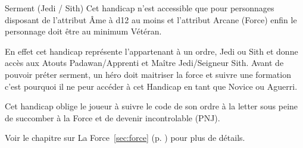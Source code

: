 \begin{paperbox}{Serment (Jedi / Sith)}
    Cet handicap n'est accessible que pour personnages disposant de l'attribut \^Ame à d12 au moins et l'attribut Arcane (Force) enfin le personnage doit être au minimum Vétéran. 

    En effet cet handicap représente l'appartenant à un ordre, Jedi ou Sith et donne accès aux Atouts Padawan/Apprenti et Maître Jedi/Seigneur Sith. Avant de pouvoir préter serment, un héro doit maitriser la force et suivre une formation c'est pourquoi il ne peur accéder à cet Handicap en tant que Novice ou Aguerri.

    Cet handicap oblige le joueur à suivre le code de son ordre à la letter sous peine de succomber à la Force et de devenir incontrolable (PNJ).

    Voir le chapitre sur La Force~\ref{sec:force} (p. \pageref{sec:force}) pour plus de détails.

\end{paperbox}